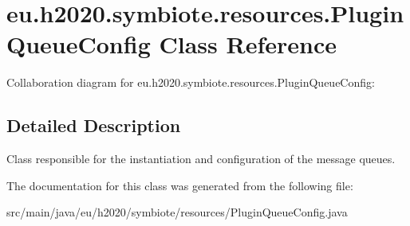 \hypertarget{classeu_1_1h2020_1_1symbiote_1_1resources_1_1PluginQueueConfig}{}\section{eu.\+h2020.\+symbiote.\+resources.\+Plugin\+Queue\+Config Class Reference}
\label{classeu_1_1h2020_1_1symbiote_1_1resources_1_1PluginQueueConfig}


Collaboration diagram for eu.\+h2020.\+symbiote.\+resources.\+Plugin\+Queue\+Config\+:


\subsection{Detailed Description}
Class responsible for the instantiation and configuration of the message queues. 

The documentation for this class was generated from the following file\+:\begin{DoxyCompactItemize}
\item 
src/main/java/eu/h2020/symbiote/resources/Plugin\+Queue\+Config.\+java\end{DoxyCompactItemize}
